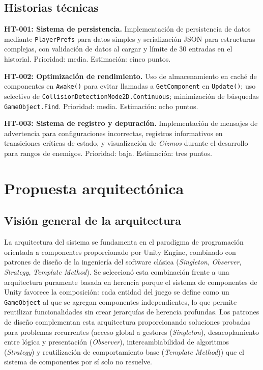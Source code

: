 \subsection{Historias técnicas}


\textbf{HT-001: Sistema de persistencia.} Implementación de persistencia de datos mediante \texttt{PlayerPrefs} para datos simples y serialización JSON para estructuras complejas, con validación de datos al cargar y límite de 30 entradas en el historial. Prioridad: media. Estimación: cinco puntos.

\textbf{HT-002: Optimización de rendimiento.} Uso de almacenamiento en caché de componentes en \texttt{Awake()} para evitar llamadas a \texttt{GetComponent} en \texttt{Update()}; uso selectivo de \texttt{CollisionDetectionMode2D}\texttt{.Continuous}; minimización de búsquedas \texttt{GameObject.Find}. Prioridad: media. Estimación: ocho puntos.

\textbf{HT-003: Sistema de registro y depuración.} Implementación de mensajes de advertencia para configuraciones incorrectas, registros informativos en transiciones críticas de estado, y visualización de \textit{Gizmos} durante el desarrollo para rangos de enemigos. Prioridad: baja. Estimación: tres puntos.

\section{Propuesta arquitectónica}


\subsection{Visión general de la arquitectura}


La arquitectura del sistema se fundamenta en el paradigma de programación orientada a componentes proporcionado por Unity Engine, combinado con patrones de diseño de la ingeniería del software clásica (\textit{Singleton}, \textit{Observer}, \textit{Strategy}, \textit{Template Method}). Se seleccionó esta combinación frente a una arquitectura puramente basada en herencia porque el sistema de componentes de Unity favorece la composición: cada entidad del juego se define como un \texttt{GameObject} al que se agregan componentes independientes, lo que permite reutilizar funcionalidades sin crear jerarquías de herencia profundas. Los patrones de diseño complementan esta arquitectura proporcionando soluciones probadas para problemas recurrentes (acceso global a gestores (\textit{Singleton}), desacoplamiento entre lógica y presentación (\textit{Observer}), intercambiabilidad de algoritmos (\textit{Strategy}) y reutilización de comportamiento base (\textit{Template Method})) que el sistema de componentes por sí solo no resuelve.

